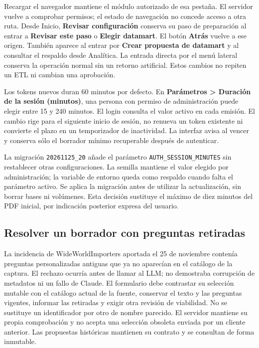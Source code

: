 \documentclass[11pt,letterpaper]{article}
\newcommand{\file}[1]{\texttt{#1}}
\begin{document}
Recargar el navegador mantiene el módulo autorizado de esa pestaña. El servidor
vuelve a comprobar permisos; el estado de navegación no concede acceso a otra ruta.
Desde Inicio, \textbf{Revisar configuración} conserva su paso de preparación al
entrar a \textbf{Revisar este paso} o \textbf{Elegir datamart}. El botón
\textbf{Atrás} vuelve a ese origen. También aparece al entrar por
\textbf{Crear propuesta de datamart} y al consultar el respaldo desde Analítica.
La entrada directa por el menú lateral conserva la operación normal sin un retorno
artificial. Estos cambios no repiten un ETL ni cambian una aprobación.

Los tokens nuevos duran 60 minutos por defecto. En \textbf{Parámetros > Duración
de la sesión (minutos)}, una persona con permiso de administración puede elegir
entre 15 y 240 minutos. El login consulta el valor activo en cada emisión. El
cambio rige para el siguiente inicio de sesión, no renueva un token existente ni
convierte el plazo en un temporizador de inactividad. La interfaz avisa al vencer
y conserva sólo el borrador mínimo recuperable después de autenticar.

La migración \file{20261125\_20} añade el parámetro
\file{AUTH\_SESSION\_MINUTES} sin restablecer otras configuraciones. La semilla
mantiene el valor elegido por administración; la variable de entorno queda como
respaldo cuando falta el parámetro activo. Se aplica la migración antes de utilizar
la actualización, sin borrar bases ni volúmenes. Esta decisión sustituye el máximo
de diez minutos del PDF inicial, por indicación posterior expresa del usuario.

\subsection{Resolver un borrador con preguntas retiradas}

La incidencia de WideWorldImporters aportada el 25 de noviembre contenía preguntas
personalizadas antiguas que ya no aparecían en el catálogo de la captura. El rechazo
ocurría antes de llamar al LLM; no demostraba corrupción de metadatos ni un fallo
de Claude. El formulario debe contrastar su selección mutable con el catálogo
actual de la fuente, conservar el texto y las preguntas vigentes, informar las
retiradas y exigir otra revisión de viabilidad. No se sustituye un identificador
por otro de nombre parecido. El servidor mantiene su propia comprobación y no
acepta una selección obsoleta enviada por un cliente anterior. Las propuestas
históricas mantienen su contrato y se consultan de forma inmutable.
\end{document}
